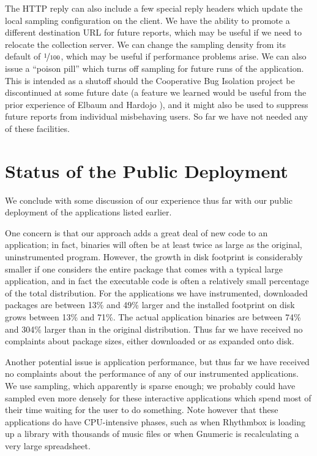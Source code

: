 \documentclass[10pt,twocolumn]{article}
\newcommand{\gnumeric}{Gnumeric\xspace}
\newcommand{\rhythmbox}{Rhythmbox\xspace}
\begin{document}
The HTTP reply can also include a few special reply headers which
update the local sampling configuration on the client.  We have the
ability to promote a different destination URL for future reports,
which may be useful if we need to relocate the collection server.  We
can change the sampling density from its default of
$\nicefrac{1}{100}$, which may be useful if performance problems
arise.  We can also issue a ``poison pill'' which turns off sampling
for future runs of the application.  This is intended as a shutoff
should the Cooperative Bug Isolation project be discontinued at some
future date (a feature we learned would be useful from the prior
experience of Elbaum and Hardojo \cite{Elbaum:2003:DISATA}), and it
might also be used to suppress future reports from individual
misbehaving users.  So far we have not needed any of these facilities.

\section{Status of the Public Deployment}

We conclude with some discussion of our experience thus far with our public
deployment of the applications listed earlier.

One concern is that our approach adds a great deal of new code
to an application; in fact, binaries will often be at least twice as
large as the original, uninstrumented program.  However, the growth in
disk footprint is considerably smaller if one considers the entire
package that comes with a typical large application, and in fact the
executable code is often a relatively small percentage of the total
distribution.  For the applications we have instrumented, downloaded
packages are between 13\% and 49\% larger and the installed footprint
on disk grows between 13\% and 71\%.  The actual application binaries
are between 74\% and 304\% larger than in the original distribution.
Thus far we have received no complaints about package sizes, either
downloaded or as expanded onto disk.

Another potential issue is application performance, but thus far we
have received no complaints about the performance of any of our
instrumented applications.  We use  sampling, which
apparently is sparse enough; we probably could have sampled even more
densely for these interactive applications which spend most of their
time waiting for the user to do something.  Note however that 
these applications do have CPU-intensive phases, such as when
\rhythmbox is loading up a library with thousands of music files or
when \gnumeric is recalculating a very large spreadsheet.
\end{document}
